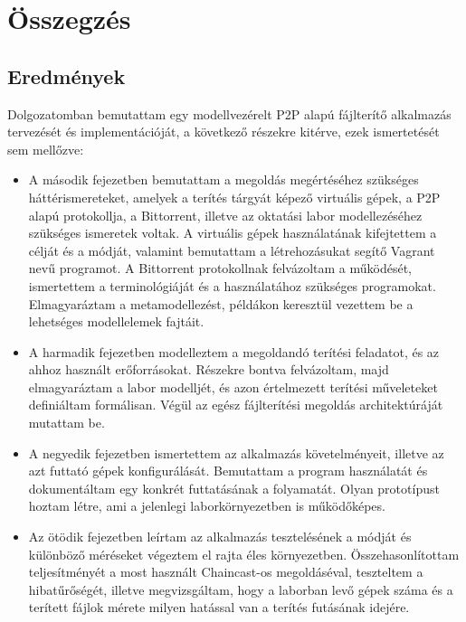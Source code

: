 \chapter{Összegzés}
\label{chp:summary}

\section{Eredmények}
 
Dolgozatomban bemutattam egy modellvezérelt P2P alapú fájlterítő alkalmazás tervezését és implementációját, a következő részekre kitérve,  ezek ismertetését sem mellőzve:

\begin{itemize}
  \item A második fejezetben bemutattam a megoldás megértéséhez szükséges háttérismereteket, amelyek a terítés tárgyát képező virtuális gépek, a P2P alapú protokollja, a Bittorrent, illetve az oktatási labor modellezéséhez szükséges ismeretek voltak. A virtuális gépek használatának kifejtettem a célját és a módját, valamint bemutattam a létrehozásukat segítő Vagrant nevű programot. A Bittorrent protokollnak felvázoltam a működését, ismertettem a terminológiáját és a használatához szükséges programokat. Elmagyaráztam a metamodellezést, példákon keresztül vezettem be a lehetséges modellelemek fajtáit. 
  \item A harmadik fejezetben modelleztem a megoldandó terítési feladatot, és az ahhoz használt erőforrásokat. Részekre bontva felvázoltam, majd elmagyaráztam a labor modelljét, és azon értelmezett terítési műveleteket definiáltam formálisan. Végül az egész fájlterítési megoldás architektúráját mutattam be.
  \item A negyedik fejezetben ismertettem az alkalmazás követelményeit, illetve az azt futtató gépek konfigurálását. Bemutattam a program használatát és dokumentáltam egy konkrét futtatásának a folyamatát. Olyan prototípust hoztam létre, ami a jelenlegi laborkörnyezetben is működőképes.
  \item Az ötödik fejezetben leírtam az alkalmazás tesztelésének a módját és különböző méréseket végeztem el rajta éles környezetben. Összehasonlítottam teljesítményét a most használt Chaincast-os megoldáséval, teszteltem a hibatűrőségét, illetve megvizsgáltam, hogy a laborban levő gépek száma és a terített fájlok mérete milyen hatással van a terítés futásának idejére.
\end{itemize}


